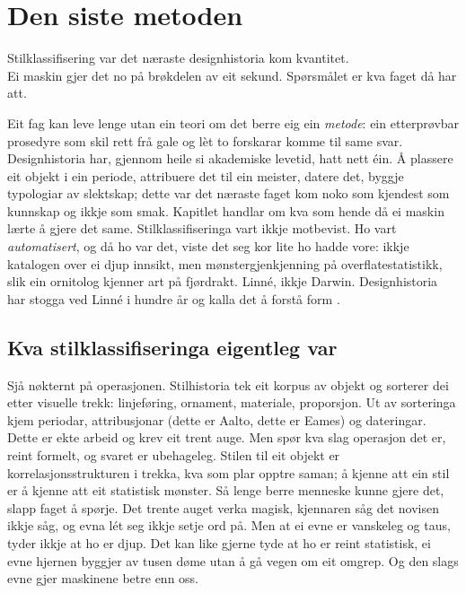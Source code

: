 \chapter{Den siste metoden}

\begin{motto}
Stilklassifisering var det næraste designhistoria kom kvantitet.\\ Ei maskin gjer det no på brøkdelen av eit sekund. Spørsmålet er kva faget då har att.
\end{motto}

Eit fag kan leve lenge utan ein teori om det berre eig ein \emph{metode}: ein etterprøvbar prosedyre som skil rett frå gale og lèt to forskarar komme til same svar. Designhistoria har, gjennom heile si akademiske levetid, hatt nett éin. Å plassere eit objekt i ein periode, attribuere det til ein meister, datere det, byggje typologiar av slektskap; dette var det næraste faget kom noko som kjendest som kunnskap og ikkje som smak. Kapitlet handlar om kva som hende då ei maskin lærte å gjere det same. Stilklassifiseringa vart ikkje motbevist. Ho vart \emph{automatisert}, og då ho var det, viste det seg kor lite ho hadde vore: ikkje katalogen over ei djup innsikt, men mønstergjenkjenning på overflatestatistikk, slik ein ornitolog kjenner art på fjørdrakt. Linné, ikkje Darwin. Designhistoria har stogga ved Linné i hundre år og kalla det å forstå form \autocite{fallan2010}.

\section{Kva stilklassifiseringa eigentleg var}

Sjå nøkternt på operasjonen. Stilhistoria tek eit korpus av objekt og sorterer dei etter visuelle trekk: linjeføring, ornament, materiale, proporsjon. Ut av sorteringa kjem periodar, attribusjonar (dette er Aalto, dette er Eames) og dateringar. Dette er ekte arbeid og krev eit trent auge. Men spør kva slag operasjon det er, reint formelt, og svaret er ubehageleg. Stilen til eit objekt er korrelasjonsstrukturen i trekka, kva som plar opptre saman; å kjenne att ein stil er å kjenne att eit statistisk mønster. Så lenge berre menneske kunne gjere det, slapp faget å spørje. Det trente auget verka magisk, kjennaren såg det novisen ikkje såg, og evna lét seg ikkje setje ord på. Men at ei evne er vanskeleg og taus, tyder ikkje at ho er djup. Det kan like gjerne tyde at ho er reint statistisk, ei evne hjernen byggjer av tusen døme utan å gå vegen om eit omgrep. Og den slags evne gjer maskinene betre enn oss.

